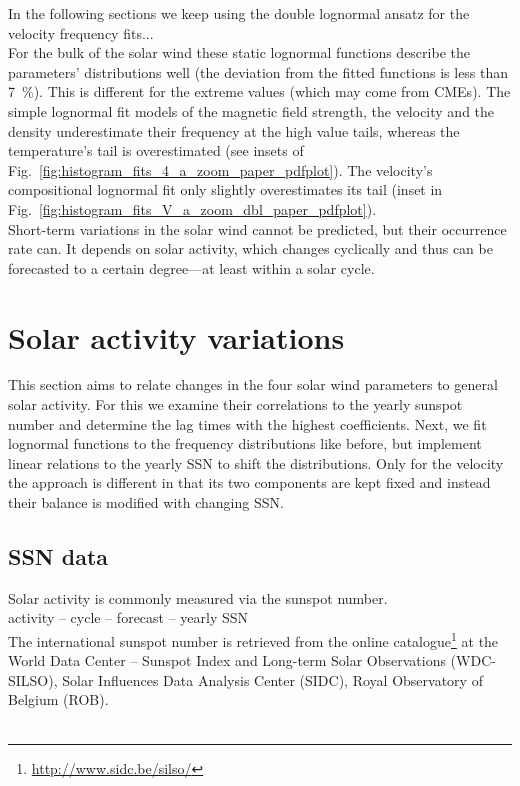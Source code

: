 In the following sections we keep using the double lognormal ansatz for the velocity frequency fits...\\

For the bulk of the solar wind these static lognormal functions describe the parameters' distributions well (the deviation from the fitted functions is less than \SI{7}{\percent}). This is different for the extreme values (which may come from CMEs). The simple lognormal fit models of the magnetic field strength, the velocity and the density underestimate their frequency at the high value tails, whereas the temperature's tail is overestimated (see insets of Fig.~\ref{fig:histogram_fits_4_a_zoom_paper_pdfplot}). The velocity's compositional lognormal fit only slightly overestimates its tail (inset in Fig.~\ref{fig:histogram_fits_V_a_zoom_dbl_paper_pdfplot}).\\

Short-term variations in the solar wind cannot be predicted, but their occurrence rate can. It depends on solar activity, which changes cyclically and thus can be forecasted to a certain degree---at least within a solar cycle.\\


\section{Solar activity variations}
\label{sec:solar_activity_variations}
This section aims to relate changes in the four solar wind parameters to general solar activity. For this we examine their correlations to the yearly sunspot number and determine the lag times with the highest coefficients. Next, we fit lognormal functions to the frequency distributions like before, but implement linear relations to the yearly SSN to shift the distributions. Only for the velocity the approach is different in that its two components are kept fixed and instead their balance is modified with changing SSN.

\subsection{SSN data}
Solar activity is commonly measured via the sunspot number.\\

activity -- cycle -- forecast -- yearly SSN\\

The international sunspot number is retrieved from the online catalogue\footnote{\url{http://www.sidc.be/silso/}} at the World Data Center -- Sunspot Index and Long-term Solar Observations (WDC-SILSO), Solar Influences Data Analysis Center (SIDC), Royal Observatory of Belgium (ROB).\\
\citet{sidc}\\

